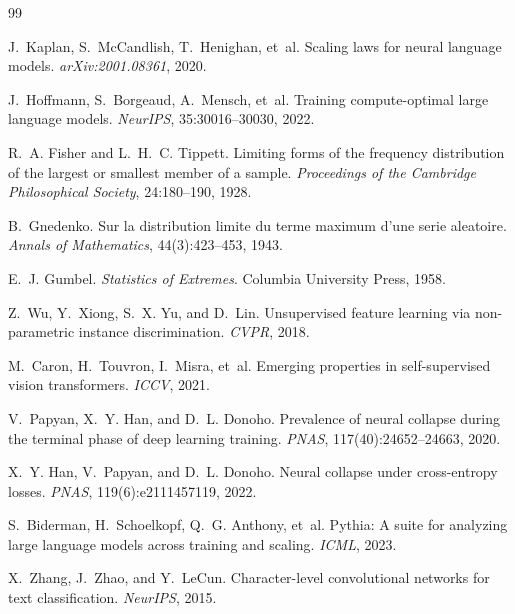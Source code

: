\documentclass{article}
\begin{document}
\begin{thebibliography}{99}

J.~Kaplan, S.~McCandlish, T.~Henighan, et~al.
\newblock Scaling laws for neural language models.
\newblock \emph{arXiv:2001.08361}, 2020.

J.~Hoffmann, S.~Borgeaud, A.~Mensch, et~al.
\newblock Training compute-optimal large language models.
\newblock \emph{NeurIPS}, 35:30016--30030, 2022.

R.~A. Fisher and L.~H.~C. Tippett.
\newblock Limiting forms of the frequency distribution of the largest or smallest member of a sample.
\newblock \emph{Proceedings of the Cambridge Philosophical Society}, 24:180--190, 1928.

B.~Gnedenko.
\newblock Sur la distribution limite du terme maximum d'une serie aleatoire.
\newblock \emph{Annals of Mathematics}, 44(3):423--453, 1943.

E.~J. Gumbel.
\newblock \emph{Statistics of Extremes}.
\newblock Columbia University Press, 1958.

Z.~Wu, Y.~Xiong, S.~X. Yu, and D.~Lin.
\newblock Unsupervised feature learning via non-parametric instance discrimination.
\newblock \emph{CVPR}, 2018.

M.~Caron, H.~Touvron, I.~Misra, et~al.
\newblock Emerging properties in self-supervised vision transformers.
\newblock \emph{ICCV}, 2021.

V.~Papyan, X.~Y. Han, and D.~L. Donoho.
\newblock Prevalence of neural collapse during the terminal phase of deep learning training.
\newblock \emph{PNAS}, 117(40):24652--24663, 2020.

X.~Y. Han, V.~Papyan, and D.~L. Donoho.
\newblock Neural collapse under cross-entropy losses.
\newblock \emph{PNAS}, 119(6):e2111457119, 2022.

S.~Biderman, H.~Schoelkopf, Q.~G. Anthony, et~al.
\newblock Pythia: A suite for analyzing large language models across training and scaling.
\newblock \emph{ICML}, 2023.

X.~Zhang, J.~Zhao, and Y.~LeCun.
\newblock Character-level convolutional networks for text classification.
\newblock \emph{NeurIPS}, 2015.


\end{thebibliography}
\end{document}
